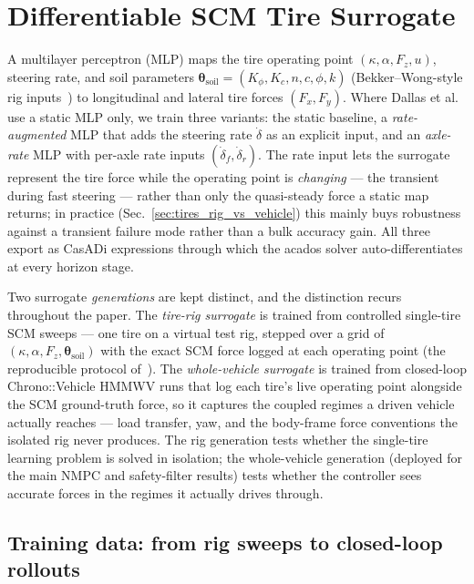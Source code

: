 \documentclass[conference,letterpaper,10pt]{IEEEtran}
\begin{document}
\section{Differentiable SCM Tire Surrogate}
\label{sec:tires}

A multilayer perceptron (MLP) maps the tire operating point
$(\kappa,\alpha,F_z,u)$, steering rate, and soil parameters
$\boldsymbol{\theta}_{\mathrm{soil}}\!=\!(K_\phi,K_c,n,c,\phi,k)$
(Bekker--Wong-style rig inputs~\cite{Shibly05}) to longitudinal and
lateral tire forces $(F_x, F_y)$. Where Dallas et
al.~\cite{Dallas21} use a static MLP only, we train three variants:
the static baseline, a \emph{rate-augmented} MLP that adds the
steering rate $\dot\delta$ as an explicit input, and an
\emph{axle-rate} MLP with per-axle rate inputs
$(\dot\delta_f,\dot\delta_r)$. The rate input lets the surrogate
represent the tire force while the operating point is \emph{changing}
--- the transient during fast steering --- rather than only the
quasi-steady force a static map returns; in practice
(Sec.~\ref{sec:tires_rig_vs_vehicle}) this mainly buys robustness
against a transient failure mode rather than a bulk accuracy gain. All
three export as CasADi expressions through which the acados solver
auto-differentiates at every horizon stage.

Two surrogate \emph{generations} are kept distinct, and the
distinction recurs throughout the paper. The \emph{tire-rig surrogate}
is trained from controlled single-tire SCM sweeps --- one tire on a
virtual test rig, stepped over a grid of
$(\kappa,\alpha,F_z,\boldsymbol{\theta}_{\mathrm{soil}})$ with the
exact SCM force logged at each operating point (the reproducible
protocol of~\cite{Dallas21}). The \emph{whole-vehicle surrogate} is
trained from closed-loop Chrono::Vehicle HMMWV runs that log each
tire's live operating point alongside the SCM ground-truth force, so
it captures the coupled regimes a driven vehicle actually reaches ---
load transfer, yaw, and the body-frame force conventions the isolated
rig never produces. The rig generation tests whether the single-tire
learning problem is solved in isolation; the whole-vehicle generation
(deployed for the main NMPC and safety-filter results) tests whether
the controller sees accurate forces in the regimes it actually drives
through.

\subsection{Training data: from rig sweeps to closed-loop rollouts}
\label{sec:tires_rig_to_cl}
\label{sec:training_data}
\end{document}
